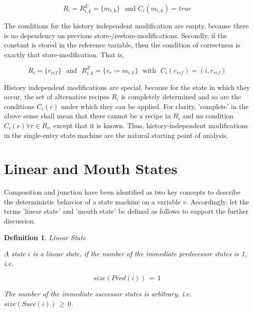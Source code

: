 \documentclass[12pt,a4paper]{scrartcl}
\newtheorem{definition}{Definition}
\begin{document}
\begin{equation} \label{eq:R-entry-junction}
    R_i = R^E_{i,k} = \{ m_{i,k} \} \,\,\mbox{ and } C_i(m_{i,k}) = true
\end{equation}

The conditions for the history independent modification are empty, because there 
is no dependency on previous store-/restore-modifications. Secondly, if the constant
is stored in the reference variable, then the condition of correctness is
exactly that store-modification. That is, 

\begin{equation} \label{eq:R-entry-junction}
    R_i = \{ r_{ref} \} \,\,\mbox{ and }  \,\, R^E_{i,k} = \{ v_r \coloneq m_{i,k} \}
                        \,\,\mbox{ with } \,\, C_i(r_{ref}) = (i, r_{ref})
\end{equation}

History independent modifications are special, because for the state in which they
occur, the set of alternative recipes $R_i$ is completely determined and so are
the conditions $C_i(r)$ under which they can be applied. For clarity,
'complete' in the above sense shall mean that there cannot be a recipe in $R_i$
and no condition $C_i(r)\forall r\in R_i$, except that it is known. Thus,
history-independent modifications in the single-entry state machine are the
natural starting point of analysis.

\section{Linear and Mouth States}

Composition and junction have been identified as two key concepts to describe
the deterministic behavior of a state machine on a variable $v$. Accordingly,
let the terms 'linear state' and 'mouth state' be defined as follows to support
the further discussion. 

\begin{definition} Linear State

    A state $i$ is a linear state, if the number of the immediate predecessor 
    states is 1, i.e. 

    \begin{equation}
                size(Pred(i))\,=\,1
    \end{equation}

    The number of the immediate successor states is arbitrary, i.e.
    $size(Succ(i))\,\ge\,0$.

\end{definition}
\end{document}
